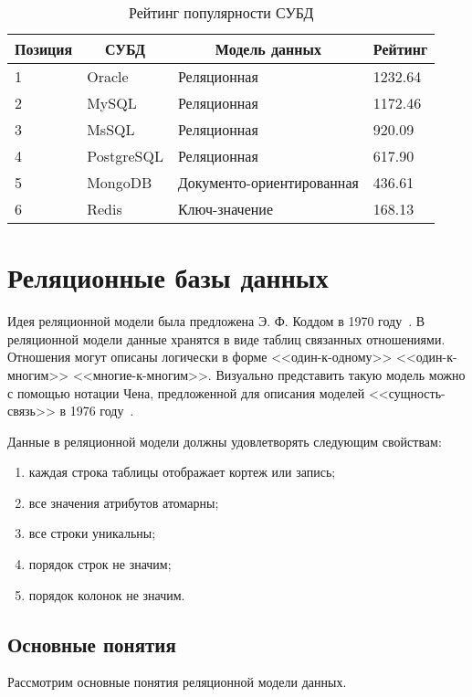\begin{table}[h!]
    \centering
    \caption{Рейтинг популярности СУБД}
    \label{tab:db_ranking}
    \begin{tabular}{|l|l|l|l|}
        \hline
        \multicolumn{1}{|c|}{Позиция} & \multicolumn{1}{c|}{СУБД} & \multicolumn{1}{c|}{Модель данных} & \multicolumn{1}{c|}{Рейтинг} \\ \hline
        1 & Oracle     & Реляционная               & 1232.64 \\ \hline
        2 & MySQL      & Реляционная               & 1172.46 \\ \hline
        3 & MsSQL      & Реляционная               & 920.09  \\ \hline
        4 & PostgreSQL & Реляционная               & 617.90  \\ \hline
        5 & MongoDB    & Документо-ориентированная & 436.61  \\ \hline
        6 & Redis      & Ключ-значение             & 168.13  \\ \hline
    \end{tabular}
\end{table}


\section{Реляционные базы данных}

Идея реляционной модели была предложена Э. Ф. Коддом в 1970 году~\cite{Codd_Relational}.
В реляционной модели данные хранятся в виде таблиц связанных отношениями.
Отношения могут описаны логически в форме 
<<один-к-одному>> <<один-к-многим>> <<многие-к-многим>>.
Визуально представить такую модель можно с помощью нотации Чена, 
предложенной для описания моделей <<сущность-связь>> в 1976 году~\cite{Chen}.

Данные в реляционной модели должны удовлетворять следующим свойствам:
\begin{enumerate}
    \item каждая строка таблицы отображает кортеж или запись;
    \item все значения атрибутов атомарны;
    \item все строки уникальны;
    \item порядок строк не значим;
    \item порядок колонок не значим.
\end{enumerate}

\clearpage

\subsection{Основные понятия}
Рассмотрим основные понятия реляционной модели данных.


